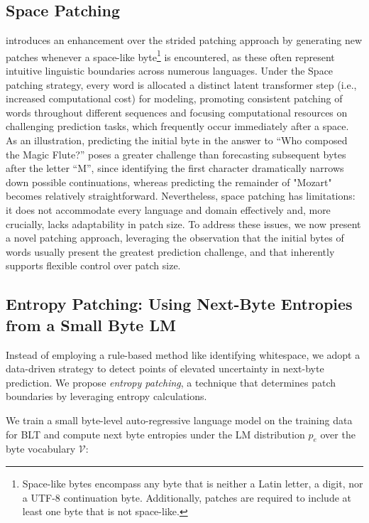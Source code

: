 \subsection{Space Patching}
\label{section:white-patch}

\citet{slagle2024spacebyte} introduces an enhancement over the strided patching approach by generating new patches whenever a space-like byte\footnote{
    Space-like bytes encompass any byte that is neither a Latin letter, a digit, nor a UTF-8 continuation byte. Additionally, patches are required to include at least one byte that is not space-like. } is encountered, as these often represent intuitive linguistic boundaries across numerous languages. Under the Space patching strategy, every word is allocated a distinct latent transformer step (i.e., increased computational cost) for modeling, promoting consistent patching of words throughout different sequences and focusing computational resources on challenging prediction tasks, which frequently occur immediately after a space. As an illustration, predicting the initial byte in the answer to “Who composed the Magic Flute?\uline{\hspace{.6em}}” poses a greater challenge than forecasting subsequent bytes after the letter “M”, since identifying the first character dramatically narrows down possible continuations, whereas predicting the remainder of "Mozart" becomes relatively straightforward. Nevertheless, space patching has limitations: it does not accommodate every language and domain effectively and, more crucially, lacks adaptability in patch size. To address these issues, we now present a novel patching approach, leveraging the observation that the initial bytes of words usually present the greatest prediction challenge, and that inherently supports flexible control over patch size.

\subsection{Entropy Patching: Using Next-Byte Entropies from a Small Byte LM}
\label{section:dyn-patch}

Instead of employing a rule-based method like identifying whitespace, we adopt a data-driven strategy to detect points of elevated uncertainty in next-byte prediction. We propose \textit{entropy patching}, a technique that determines patch boundaries by leveraging entropy calculations.

We train a small byte-level auto-regressive language model on the training data for {\textsc BLT} and compute next byte entropies under the LM distribution $p_{e}$ over the byte vocabulary $\mathcal{V}$:


